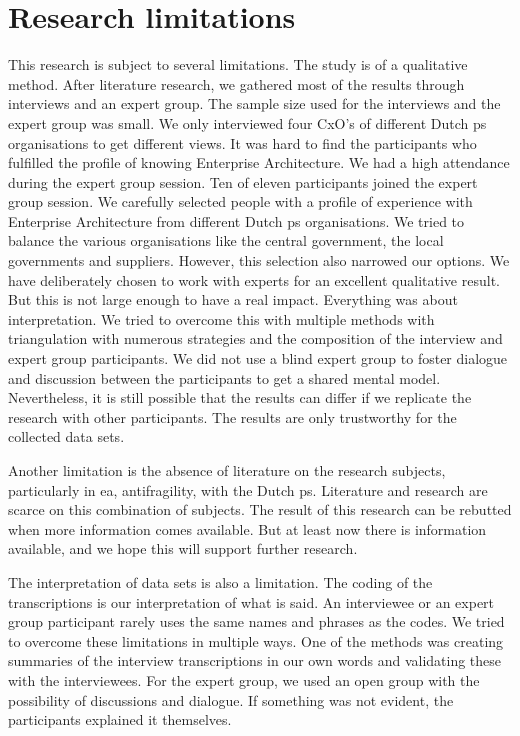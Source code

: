 \section{Research limitations}
\label{sec:limitations}
This research is subject to several limitations. The study is of a qualitative method. After literature research, we gathered most of the results through interviews and an expert group. The sample size used for the interviews and the expert group was small. We only interviewed four CxO's of different Dutch \gls{ps} organisations to get different views. It was hard to find the participants who fulfilled the profile of knowing Enterprise Architecture. We had a high attendance during the expert group session. Ten of eleven participants joined the expert group session. We carefully selected people with a profile of experience with Enterprise Architecture from different Dutch \gls{ps} organisations. We tried to balance the various organisations like the central government, the local governments and suppliers. However, this selection also narrowed our options. We have deliberately chosen to work with experts for an excellent qualitative result. But this is not large enough to have a real impact. Everything was about interpretation. We tried to overcome this with multiple methods with triangulation with numerous strategies and the composition of the interview and expert group participants. We did not use a blind expert group to foster dialogue and discussion between the participants to get a shared mental model. Nevertheless, it is still possible that the results can differ if we replicate the research with other participants. The results are only trustworthy for the collected data sets. 

Another limitation is the absence of literature on the research subjects, particularly in \gls{ea}, \gls{antifragility}, with the Dutch \gls{ps}. Literature and research are scarce on this combination of subjects. The result of this research can be rebutted when more information comes available. But at least now there is information available, and we hope this will support further research.

The interpretation of data sets is also a limitation. The coding of the transcriptions is our interpretation of what is said. An interviewee or an expert group participant rarely uses the same names and phrases as the codes. We tried to overcome these limitations in multiple ways. One of the methods was creating summaries of the interview transcriptions in our own words and validating these with the interviewees. For the expert group, we used an open group with the possibility of discussions and dialogue. If something was not evident, the participants explained it themselves.

